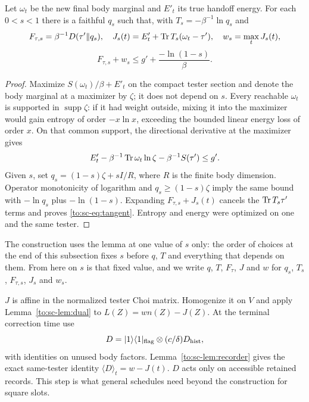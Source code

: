 \begin{lemma}\label{to:sc-lem:tangent}
Let $\omega_t$ be the new final body marginal and $E'_t$ its true handoff energy. For each $0<s<1$ there is a faithful $q_s$ such that, with $T_s=-\beta^{-1}\ln q_s$ and
\[
F_{\tau,s}=\beta^{-1}D(\tau'\|q_s),\quad
J_s(t)=E'_t+\operatorname{Tr} T_s(\omega_t-\tau'),\quad w_s=\max_tJ_s(t),
\]
\begin{equation}\label{to:sc-eq:tangent}
F_{\tau,s}+w_s\le g'+\frac{-\ln(1-s)}\beta.
\end{equation}
\end{lemma}
\begin{proof}
Maximize $S(\omega_t)/\beta+E'_t$ on the compact tester section and denote the body marginal at a maximizer by $\zeta$; it does not depend on $s$. Every reachable $\omega_t$ is supported in $\operatorname{supp}\zeta$: if it had weight outside, mixing it into the maximizer would gain entropy of order $-x\ln x$, exceeding the bounded linear energy loss of order $x$. On that common support, the directional derivative at the maximizer gives
\[
E'_t-\beta^{-1}\operatorname{Tr}\omega_t\ln\zeta-\beta^{-1}S(\tau')\le g'.
\]
Given $s$, set $q_s=(1-s)\zeta+sI/R$, where $R$ is the finite body dimension. Operator monotonicity of logarithm and $q_s\ge(1-s)\zeta$ imply the same bound with $-\ln q_s$ plus $-\ln(1-s)$. Expanding $F_{\tau,s}+J_s(t)$ cancels the $\operatorname{Tr} T_s\tau'$ terms and proves \eqref{to:sc-eq:tangent}. Entropy and energy were optimized on one and the same tester.
\end{proof}

The construction uses the lemma at one value of $s$ only: the order of choices at the end of this subsection fixes $s$ before $q$, $T$ and everything that depends on them. From here on $s$ is that fixed value, and we write $q$, $T$, $F_\tau$, $J$ and $w$ for $q_s$, $T_s$, $F_{\tau,s}$, $J_s$ and $w_s$.

$J$ is affine in the normalized tester Choi matrix. Homogenize it on $V$ and apply Lemma~\ref{to:sc-lem:dual} to $L(Z)=w n(Z)-J(Z)$. At the terminal correction time use
\[
D=|1\rangle\langle1|_{\rm flag}\otimes(c/\delta)D_{\rm hist},
\]
with identities on unused body factors. Lemma~\ref{to:sc-lem:recorder} gives the exact same-tester identity $\langle D\rangle_t=w-J(t)$. $D$ acts only on accessible retained records. This step is what general schedules need beyond the construction for square slots.

